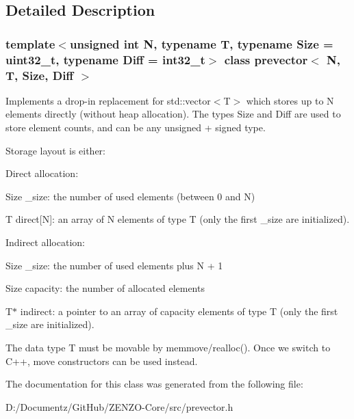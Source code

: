 \subsection{Detailed Description}
\subsubsection*{template$<$unsigned int N, typename T, typename Size = uint32\+\_\+t, typename Diff = int32\+\_\+t$>$\newline
class prevector$<$ N, T, Size, Diff $>$}

Implements a drop-\/in replacement for std\+::vector$<$\+T$>$ which stores up to N elements directly (without heap allocation). The types Size and Diff are used to store element counts, and can be any unsigned + signed type.

Storage layout is either\+:
\begin{DoxyItemize}
\item Direct allocation\+:
\begin{DoxyItemize}
\item Size \+\_\+size\+: the number of used elements (between 0 and N)
\item T direct\mbox{[}N\mbox{]}\+: an array of N elements of type T (only the first \+\_\+size are initialized).
\end{DoxyItemize}
\item Indirect allocation\+:
\begin{DoxyItemize}
\item Size \+\_\+size\+: the number of used elements plus N + 1
\item Size capacity\+: the number of allocated elements
\item T$\ast$ indirect\+: a pointer to an array of capacity elements of type T (only the first \+\_\+size are initialized).
\end{DoxyItemize}
\end{DoxyItemize}

The data type T must be movable by memmove/realloc(). Once we switch to C++, move constructors can be used instead. 

The documentation for this class was generated from the following file\+:\begin{DoxyCompactItemize}
\item 
D\+:/\+Documentz/\+Git\+Hub/\+Z\+E\+N\+Z\+O-\/\+Core/src/prevector.\+h\end{DoxyCompactItemize}
